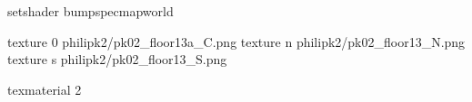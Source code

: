setshader bumpspecmapworld

texture 0 philipk2/pk02_floor13a_C.png
texture n philipk2/pk02_floor13_N.png
texture s philipk2/pk02_floor13_S.png

texmaterial 2
